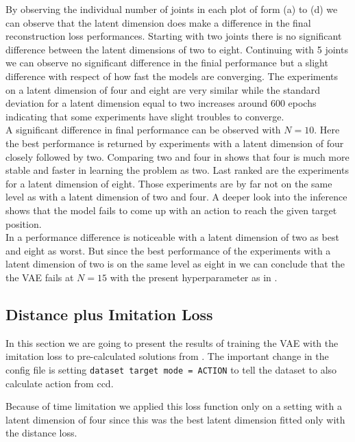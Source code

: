 By observing the individual number of joints in each plot of  form (a) to (d) we can observe that the latent dimension does make a difference in the final reconstruction loss performances. Starting with two joints there is no significant difference between the latent dimensions of two to eight. Continuing with 5 joints we can observe no significant difference in the finial performance but a slight difference with respect of how fast the models are converging. The experiments on a latent dimension of four and eight are very similar while the standard deviation for a latent dimension equal to two increases around 600 epochs indicating that some experiments have slight troubles to converge. \\
A significant difference in final performance can be observed with $N = 10$. Here the best performance is returned by experiments with a latent dimension of four closely followed by two. Comparing two and four in  shows that four is much more stable and faster in learning the problem as two. Last ranked are the experiments for a latent dimension of eight. Those experiments are by far not on the same level as with a latent dimension of two and four. A deeper look into the inference shows that the model fails to come up with an action to reach the given target position.\\
In  a performance difference is noticeable with a latent dimension of two as best and eight as worst. But since the best performance of the experiments with a latent dimension of two is on the same level as eight in  we can conclude that the the VAE fails at $N = 15$ with the present hyperparameter as in .

\subsection{Distance plus Imitation Loss}

In this section we are going to present the results of training the VAE with the imitation loss to pre-calculated solutions from . The important change in the config file is setting \texttt{dataset target mode = ACTION} to tell the dataset to also calculate action from ccd.  

Because of time limitation we applied this loss function only on a setting with a latent dimension of four since this was the best latent dimension fitted only with the distance loss. 

